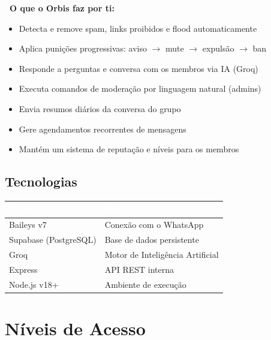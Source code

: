 \documentclass[12pt,a4paper]{article}
\begin{document}
\begin{tcolorbox}[notebox]
\textbf{\textcolor{orbisblue}{\faInfoCircle\ O que o Orbis faz por ti:}}
\begin{itemize}[leftmargin=1.2em, itemsep=2pt]
  \item Detecta e remove spam, links proibidos e flood automaticamente
  \item Aplica punições progressivas: aviso $\to$ mute $\to$ expulsão $\to$ ban
  \item Responde a perguntas e conversa com os membros via IA (Groq)
  \item Executa comandos de moderação por linguagem natural (admins)
  \item Envia resumos diários da conversa do grupo
  \item Gere agendamentos recorrentes de mensagens
  \item Mantém um sistema de reputação e níveis para os membros
\end{itemize}
\end{tcolorbox}

\subsection{Tecnologias}

\begin{center}
\begin{tabular}{L{3.5cm} L{9cm}}
\toprule
{}\textcolor{white}{\textbf{Tecnologia}} & \textcolor{white}{\textbf{Função}} \\
\midrule
Baileys v7 & Conexão com o WhatsApp \\
 Supabase (PostgreSQL) & Base de dados persistente \\
Groq & Motor de Inteligência Artificial \\
 Express & API REST interna \\
Node.js v18+ & Ambiente de execução \\
\bottomrule
\end{tabular}
\end{center}

\section{Níveis de Acesso}
\end{document}

